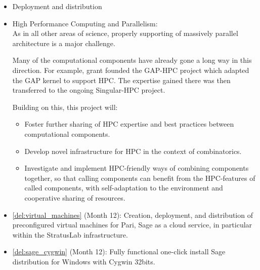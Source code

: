 \begin{Workpackage}{\thewpno}
\begin{WPDescription}
\begin{itemize}
  \item Deployment and distribution
  \item High Performance Computing and Parallelism:\\
    As in all other areas of science, properly supporting of massively
    parallel architecture is a major challenge.

    Many of the computational components have already gone a long way
    in this direction. For example, grant  founded the
    GAP-HPC project which adapted the GAP kernel to support HPC. The
    expertise gained there was then transferred to the ongoing
    Singular-HPC project.

    Building on this, this project will:
    \begin{itemize}
    \item Foster further sharing of HPC expertise and best practices
      between computational components.
    \item Develop novel infrastructure for HPC in the context of
      combinatorics.
    \item Investigate and implement HPC-friendly ways of combining
      components together, so that calling components can benefit from
      the HPC-features of called components, with self-adaptation to
      the environment and cooperative sharing of resources.
    \end{itemize}
  \end{itemize}
\end{WPDescription}

\begin{WPDeliverables}
\begin{itemize}
\item \ref{del:virtual_machines} (Month 12): Creation, deployment, and
  distribution of preconfigured virtual machines for Pari, Sage as a
  cloud service, in particular within the StratusLab infrastructure.
\item \ref{del:sage_cygwin} (Month 12): Fully functional one-click
  install Sage distribution for Windows with Cygwin 32bits.


\end{itemize}
\end{WPDeliverables}
\end{Workpackage}
